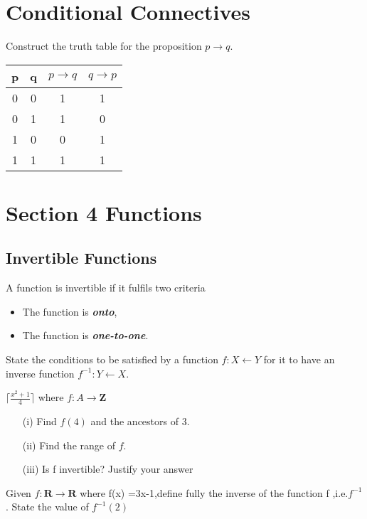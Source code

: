 \documentclass[12pt]{article} %
\begin{document}
\section{Conditional Connectives}
Construct the truth table for the proposition $p \rightarrow q$.

\begin{center}
\begin{tabular}{|c|c|c|c|}
\hline
p & q & $p \rightarrow q$ & $q \rightarrow p$ \\
\hline
0 & 0 & 1& 1 \\
0 & 1 & 1 & 0 \\
1 & 0 & 0 & 1 \\
1 & 1 & 1 & 1 \\
\hline
\end{tabular}
\end{center}


\newpage

\section{Section 4 Functions}

\subsection{Invertible Functions}
A function is invertible if it fulfils two criteria
\begin{itemize}
\item The function is \textbf{\textit{onto}},
\item The function is \textbf{\textit{one-to-one}}.
\end{itemize}

State the conditions to be satisfied by a function
$f : X \leftarrow Y$ for it to have an inverse function
$f^{-1} : Y \leftarrow X$.

$\lceil \frac{x^2+1}{4} \rceil$
where $f : A \rightarrow \textbf{Z}$
\begin{itemize}
\item[(i)] Find $f(4)$ and the ancestors of 3.
\item[(ii)] Find the range of $f$.
\item[(iii)] Is f invertible? Justify your answer
\end{itemize}

Given $f : \textbf{R} \rightarrow \textbf{R}$ where f(x) =3x-1,define fully
the inverse of the function f ,i.e.$f^{-1}$. 
State the value of $f^{-1}(2)$
\end{document}

